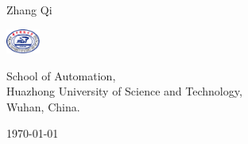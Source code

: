 
\begin{frame}\label{Title}
    \vfill
    \centering
    \\
    \vspace{15pt}\\
    \begin{minipage}[m]{3cm}
        \Bold \small Zhang Qi
    \end{minipage}\hspace{-15pt}
    \begin{minipage}[m]{1.5cm}
        \centering
        \includegraphics[height=0.8cm]{Logos/HUSTLogoWithoutSubline.pdf}
    \end{minipage}
    \begin{minipage}[m]{0.55\textwidth}
        \Normal \scriptsize School of Automation,\\Huazhong University of Science and Technology,\\Wuhan, China.
    \end{minipage}
    \vfill
    \centering
    \today
\end{frame} 